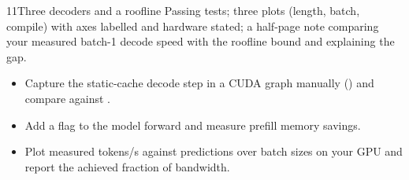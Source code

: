 \begin{labbox}{11}{Three decoders and a roofline}
Passing tests; three plots (length, batch, compile) with axes labelled and hardware stated; a
half-page note comparing your measured batch-1 decode speed with the roofline bound and explaining
the gap.

\begin{itemize}
  \item Capture the static-cache decode step in a CUDA graph manually ()
    and compare against .
  \item Add a  flag to the model forward and measure prefill memory savings.
  \item Plot measured tokens/s against  predictions over batch sizes on your GPU
    and report the achieved fraction of bandwidth.
\end{itemize}
\end{labbox}
